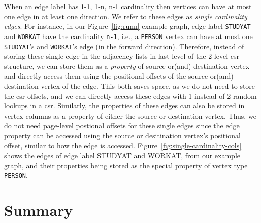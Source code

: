 When an edge label has 1-1, 1-n, n-1 cardinality then vertices can have at most one edge in at least one direction. We refer to these edges as {\em single cardinality edges}. For instance, in our Figure~\ref{fig:runn} example graph, edge label \texttt{STUDYAT} and \texttt{WORKAT} have the cardinality \texttt{n-1}, i.e., a \texttt{PERSON} vertex can have at most one \texttt{STUDYAT}'s and \texttt{WORKAT}'s edge (in the forward direction). Therefore, instead of storing these single edge in the adjacency lists in last level of the 2-level \gls{csr} structure, we can store them as a \emph{property} of source or(and) destination vertex and directly access them using the positional offsets of the source or(and) destination vertex of the edge. This both saves space, as we do not need to store the \gls{csr} offsets, and we can directly access these edges with 1 instead of 2 random lookups in a \gls{csr}. Similarly, the properties of these edges can also be stored in vertex columns as a property of either the source or destination vertex. Thus, we do not need page-level postional offsets for these single edges since the edge property can be accessed using the source or desitination vertex's positional offset, similar to how the edge is accessed. Figure~\ref{fig:single-cardinality-cols} shows the edges of edge label STUDYAT and WORKAT, from our example graph, and their properties being stored as the special property of vertex type \texttt{PERSON}.



\section{Summary}

